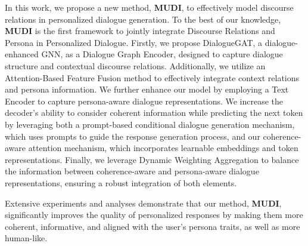 In this work, we propose a new method, \textbf{MUDI}, to effectively model discourse relations in personalized dialogue generation. To the best of our knowledge, \textbf{MUDI} is the first framework to jointly integrate Discourse Relations and Persona in Personalized Dialogue. Firstly, we propose DialogueGAT, a dialogue-enhanced GNN, as a Dialogue Graph Encoder, designed to capture dialogue structure and contextual discourse relations. Additionally, we utilize an Attention-Based Feature Fusion method to effectively integrate context relations and persona information. We further enhance our model by employing a Text Encoder to capture persona-aware dialogue representations. We increase the decoder's ability to consider coherent information while predicting the next token by leveraging both a prompt-based conditional dialogue generation mechanism, which uses prompts to guide the response generation process, and our coherence-aware attention mechanism, which incorporates learnable embeddings and token representations. Finally, we leverage Dynamic Weighting Aggregation to balance the information between coherence-aware and persona-aware dialogue representations, ensuring a robust integration of both elements.

Extensive experiments and analyses demonstrate that our method, \textbf{MUDI}, significantly improves the quality of personalized responses by making them more coherent, informative, and aligned with the user's persona traits, as well as more human-like.

\EndChapter
